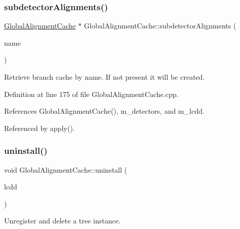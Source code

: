 \subsubsection{\texorpdfstring{subdetector\+Alignments()}{subdetectorAlignments()}}
{\footnotesize\ttfamily \hyperlink{class_d_d4hep_1_1_alignments_1_1_global_alignment_cache}{Global\+Alignment\+Cache} $\ast$ Global\+Alignment\+Cache\+::subdetector\+Alignments (\begin{DoxyParamCaption}\item[{const std\+::string \&}]{name }\end{DoxyParamCaption})\hspace{0.3cm}{\ttfamily [protected]}}



Retrieve branch cache by name. If not present it will be created. 



Definition at line 175 of file Global\+Alignment\+Cache.\+cpp.



References Global\+Alignment\+Cache(), m\+\_\+detectors, and m\+\_\+lcdd.



Referenced by apply().

\hypertarget{class_d_d4hep_1_1_alignments_1_1_global_alignment_cache_a8522b477a1db233bc330cc3c546dd9e7}{}\label{class_d_d4hep_1_1_alignments_1_1_global_alignment_cache_a8522b477a1db233bc330cc3c546dd9e7} 
\subsubsection{\texorpdfstring{uninstall()}{uninstall()}}
{\footnotesize\ttfamily void Global\+Alignment\+Cache\+::uninstall (\begin{DoxyParamCaption}\item[{\hyperlink{class_d_d4hep_1_1_geometry_1_1_l_c_d_d}{L\+C\+DD} \&}]{lcdd }\end{DoxyParamCaption})\hspace{0.3cm}{\ttfamily [static]}}



Unregister and delete a tree instance. 




